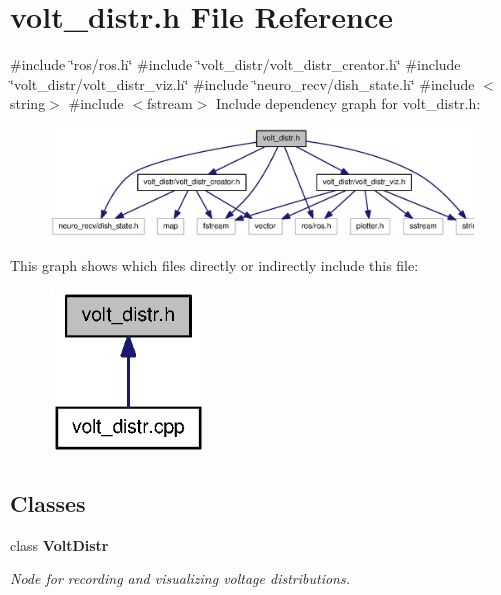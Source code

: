 \section{volt\-\_\-distr.\-h \-File \-Reference}
\label{volt__distr_8h}
{\ttfamily \#include \char`\"{}ros/ros.\-h\char`\"{}}\*
{\ttfamily \#include \char`\"{}volt\-\_\-distr/volt\-\_\-distr\-\_\-creator.\-h\char`\"{}}\*
{\ttfamily \#include \char`\"{}volt\-\_\-distr/volt\-\_\-distr\-\_\-viz.\-h\char`\"{}}\*
{\ttfamily \#include \char`\"{}neuro\-\_\-recv/dish\-\_\-state.\-h\char`\"{}}\*
{\ttfamily \#include $<$string$>$}\*
{\ttfamily \#include $<$fstream$>$}\*
\-Include dependency graph for volt\-\_\-distr.\-h\-:
\nopagebreak
\begin{figure}[H]
\begin{center}
\leavevmode
\includegraphics[width=350pt]{volt__distr_8h__incl}
\end{center}
\end{figure}
\-This graph shows which files directly or indirectly include this file\-:
\nopagebreak
\begin{figure}[H]
\begin{center}
\leavevmode
\includegraphics[width=118pt]{volt__distr_8h__dep__incl}
\end{center}
\end{figure}
\subsection*{\-Classes}
\begin{DoxyCompactItemize}
\item 
class {\bf \-Volt\-Distr}
\begin{DoxyCompactList}\small\item\em \-Node for recording and visualizing voltage distributions. \end{DoxyCompactList}\end{DoxyCompactItemize}
